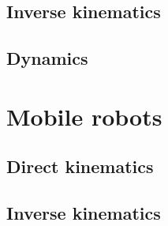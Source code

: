 \documentclass{article}
\begin{document}


	\subsection{Inverse kinematics}
	\subsection{Dynamics}
	
	\section{Mobile robots}
	\subsection{Direct kinematics}
	\subsection{Inverse kinematics}
\end{document}
